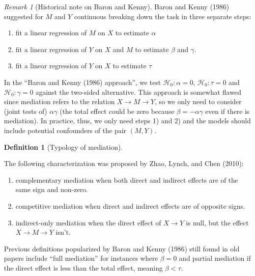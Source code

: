 \documentclass[
  11pt,
  letterpaper,
]{scrbook}
\providecommand{\tightlist}{%
  \setlength{\itemsep}{0pt}\setlength{\parskip}{0pt}}\usepackage{longtable,booktabs,array}
\theoremstyle{definition}
\theoremstyle{definition}
\newtheorem{definition}{Definition}[chapter]
\theoremstyle{remark}
\newtheorem{refremark}{Remark}[chapter]
\begin{document}
\begin{refremark}[Historical note on Baron and Kenny]
Baron and Kenny (1986) suggested for \(M\) and \(Y\) continuous breaking
down the task in three separate steps:

\begin{enumerate}
\def\labelenumi{\arabic{enumi})}
\tightlist
\item
  fit a linear regression of \(M\) on \(X\) to estimate \(\alpha\)
\item
  fit a linear regression of \(Y\) on \(X\) and \(M\) to estimate
  \(\beta\) and \(\gamma\).
\item
  fit a linear regression of \(Y\) on \(X\) to estimate \(\tau\)
\end{enumerate}

In the ``Baron and Kenny (1986) approach'', we test
\(\mathscr{H}_0: \alpha=0\), \(\mathscr{H}_0: \tau=0\) and
\(\mathscr{H}_0: \gamma=0\) against the two-sided alternative. This
approach is somewhat flawed since mediation refers to the relation
\(X \to M \to Y\), so we only need to consider (joint tests of)
\(\alpha\gamma\) (the total effect could be zero because
\(\beta = -\alpha\gamma\) even if there is mediation). In practice,
thus, we only need steps 1) and 2) and the models should include
potential confounders of the pair \((M, Y)\).

\label{rem-histnote}

\end{refremark}

\begin{definition}[Typology of
mediation]\protect\hypertarget{def-typology}{}\label{def-typology}

The following characterization was proposed by Zhao, Lynch, and Chen
(2010):

\begin{enumerate}
\def\labelenumi{\arabic{enumi}.}
\tightlist
\item
  complementary mediation when both direct and indirect effects are of
  the same sign and non-zero.
\item
  competitive mediation when direct and indirect effects are of opposite
  signs.
\item
  indirect-only mediation when the direct effect of \(X \to Y\) is null,
  but the effect \(X \to M \to Y\) isn't.
\end{enumerate}

Previous definitions popularized by Baron and Kenny (1986) still found
in old papers include ``full mediation'' for instances where \(\beta=0\)
and partial mediation if the direct effect is less than the total
effect, meaning \(\beta < \tau\).

\end{definition}
\end{document}
